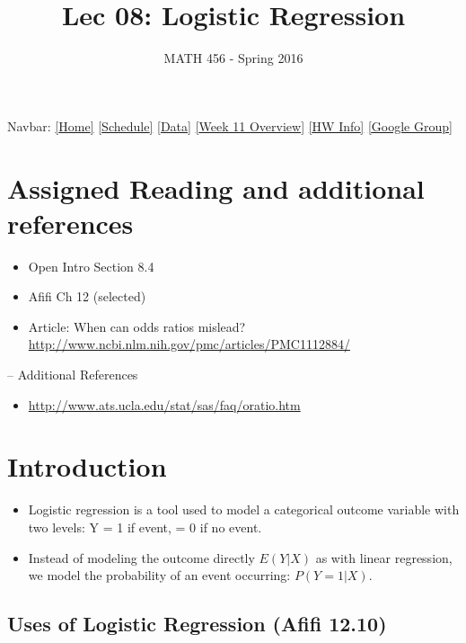 \documentclass[]{article}
\title{Lec 08: Logistic Regression}
\author{MATH 456 - Spring 2016}
\date{}
\begin{document}
\maketitle


Navbar: \href{../index.html}{{[}Home{]}}
\href{../Schedule.html}{{[}Schedule{]}}
\href{../data/Datasets.html}{{[}Data{]}} \href{../wk11.html}{{[}Week 11
Overview{]}} \href{../HW_Info.html}{{[}HW Info{]}}
\href{https://groups.google.com/forum/\#!forum/csuc_stat}{{[}Google
Group{]}}

\section{Assigned Reading and additional
references}\label{assigned-reading-and-additional-references}

\begin{itemize}
\itemsep1pt\parskip0pt
\item
  Open Intro Section 8.4
\item
  Afifi Ch 12 (selected)
\item
  Article: When can odds ratios mislead?
  \url{http://www.ncbi.nlm.nih.gov/pmc/articles/PMC1112884/}
\end{itemize}

-- Additional References

\begin{itemize}
\itemsep1pt\parskip0pt
\item
  \url{http://www.ats.ucla.edu/stat/sas/faq/oratio.htm}
\end{itemize}

\section{Introduction}\label{introduction}

\begin{itemize}
\itemsep1pt\parskip0pt
\item
  Logistic regression is a tool used to model a categorical outcome
  variable with two levels: Y = 1 if event, = 0 if no event.
\item
  Instead of modeling the outcome directly \(E(Y|X)\) as with linear
  regression, we model the probability of an event occurring:
  \(P(Y=1|X)\).
\end{itemize}

\subsection{Uses of Logistic Regression (Afifi
12.10)}\label{uses-of-logistic-regression-afifi-12.10}
\end{document}
